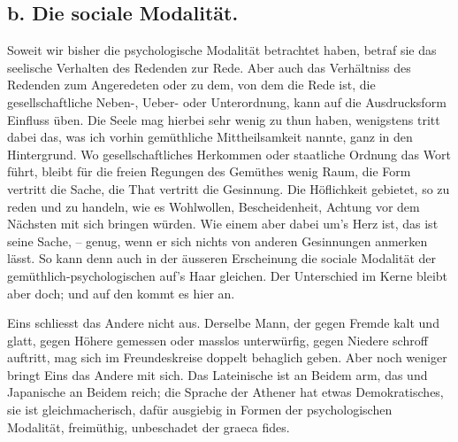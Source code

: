 \clearpage
{}
\subsection*{b. Die sociale Modalität.}\label{IV.IV.IIb}

\largerpage[-1]Soweit wir bisher die psychologische Modalität betrachtet haben, betraf sie das seelische Verhalten des Redenden zur Rede. Aber auch das Verhältniss des Redenden zum Angeredeten oder zu dem, von dem die Rede ist, die gesellschaftliche Neben-, Ueber- oder Unterordnung, kann auf die Ausdrucksform  Einfluss üben. Die Seele mag hierbei sehr wenig zu thun haben, wenigstens tritt dabei das, was ich vorhin gemüthliche Mittheilsamkeit nannte, ganz in den Hintergrund. Wo gesellschaftliches Herkommen oder staatliche Ordnung das Wort führt, bleibt für die freien Regungen des Gemüthes wenig Raum, die \label{fp.456} Form vertritt die Sache, die That vertritt die Gesinnung. Die Höflichkeit gebietet, so zu reden und zu handeln, wie es Wohlwollen, Bescheidenheit, Achtung vor dem Nächsten mit sich bringen würden. Wie einem aber dabei um’s Herz ist, das ist seine Sache, – genug, wenn er sich nichts von anderen Gesinnungen anmerken lässt. So kann denn auch in der äusseren Erscheinung die sociale Modalität der gemüthlich-psychologischen auf’s Haar gleichen. Der Unterschied im Kerne bleibt aber doch; und auf den kommt es hier an.

Eins schliesst das Andere nicht aus. Derselbe Mann, der gegen Fremde kalt und glatt, gegen Höhere gemessen oder masslos unterwürfig, gegen Niedere schroff auftritt, mag sich im Freundeskreise doppelt behaglich geben. Aber noch weniger bringt Eins das Andere mit sich. Das Lateinische ist an Beidem arm, das  und Japanische an Beidem reich; die Sprache der Athener hat etwas Demokratisches, sie ist gleichmacherisch, dafür ausgiebig in Formen der psychologischen Modalität, freimüthig, unbeschadet der graeca fides.

